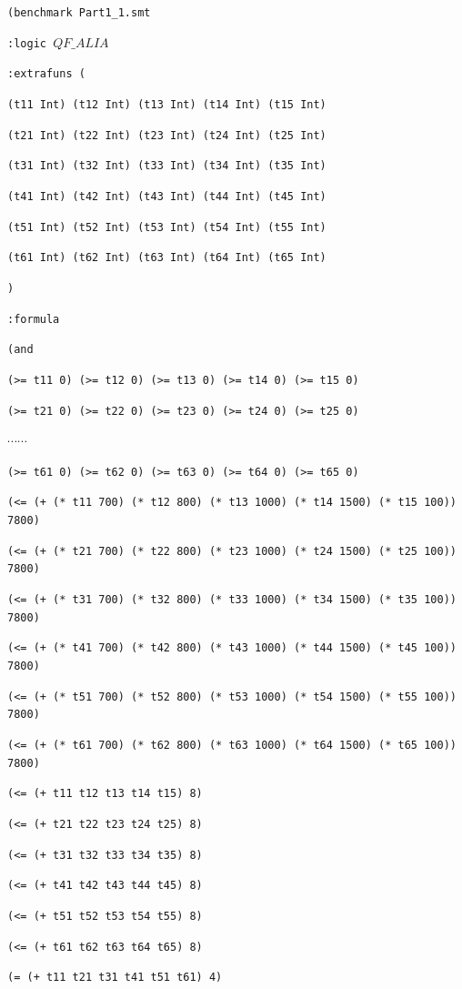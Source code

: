 \documentclass[11pt]{article}
\begin{document}
{\footnotesize

{\tt (benchmark Part1\_1.smt}

{\tt :logic $QF\_ALIA$}

{\tt :extrafuns (}

{\tt (t11 Int) (t12 Int) (t13 Int) (t14 Int) (t15 Int) }

{\tt (t21 Int) (t22 Int) (t23 Int) (t24 Int) (t25 Int) }

{\tt (t31 Int) (t32 Int) (t33 Int) (t34 Int) (t35 Int) }

{\tt (t41 Int) (t42 Int) (t43 Int) (t44 Int) (t45 Int) }

{\tt (t51 Int) (t52 Int) (t53 Int) (t54 Int) (t55 Int) }

{\tt (t61 Int) (t62 Int) (t63 Int) (t64 Int) (t65 Int) }

{\tt )}

{\tt :formula}

{\tt   (and}

{\tt (>= t11 0) (>= t12 0) (>= t13 0) (>= t14 0) (>= t15 0)}

{\tt (>= t21 0) (>= t22 0) (>= t23 0) (>= t24 0) (>= t25 0)}

$\cdots \cdots$

{\tt (>= t61 0) (>= t62 0) (>= t63 0) (>= t64 0) (>= t65 0) }

{\tt (<= (+ (* t11 700) (* t12 800) (* t13 1000) (* t14 1500) (* t15 100)) 7800)}

{\tt (<= (+ (* t21 700) (* t22 800) (* t23 1000) (* t24 1500) (* t25 100)) 7800)}

{\tt (<= (+ (* t31 700) (* t32 800) (* t33 1000) (* t34 1500) (* t35 100)) 7800)}

{\tt (<= (+ (* t41 700) (* t42 800) (* t43 1000) (* t44 1500) (* t45 100)) 7800)}

{\tt (<= (+ (* t51 700) (* t52 800) (* t53 1000) (* t54 1500) (* t55 100)) 7800)}

{\tt (<= (+ (* t61 700) (* t62 800) (* t63 1000) (* t64 1500) (* t65 100)) 7800) }

{\tt (<= (+ t11 t12 t13 t14 t15) 8)}

{\tt (<= (+ t21 t22 t23 t24 t25) 8)}

{\tt (<= (+ t31 t32 t33 t34 t35) 8)}

{\tt (<= (+ t41 t42 t43 t44 t45) 8)}

{\tt (<= (+ t51 t52 t53 t54 t55) 8)}

{\tt (<= (+ t61 t62 t63 t64 t65) 8)}

{\tt (= (+ t11 t21 t31 t41 t51 t61) 4)}

}
\end{document}
